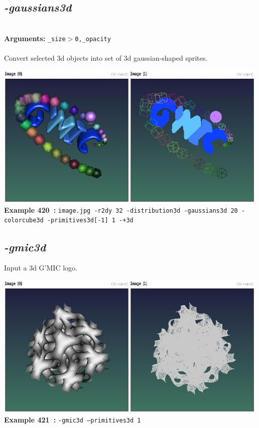 \documentclass[a4paper,11pt,twoside]{book}
\begin{document}
\subsection{\emph{-gaussians3d} }\vspace*{-0.5em}
~\\\textbf{Arguments: } 
{\small \texttt{\_size$>$0,\_opacity}}\\~\\
Convert selected 3d objects into set of 3d gaussian-shaped sprites.
\begin{center}\includegraphics[keepaspectratio=true,height=7cm,width=\textwidth]{img/gmic_def420.jpg}\\
{\footnotesize \textbf{Example 420~:} \texttt{image.jpg -r2dy 32 -distribution3d -gaussians3d 20 -colorcube3d -primitives3d[-1] 1 -+3d}}
\end{center}

\subsection{\emph{-gmic3d} }\vspace*{-0.5em}
Input a 3d G'MIC logo.
\begin{center}\includegraphics[keepaspectratio=true,height=7cm,width=\textwidth]{img/gmic_def421.jpg}\\
{\footnotesize \textbf{Example 421~:} \texttt{-gmic3d --primitives3d 1}}
\end{center}
\end{document}
